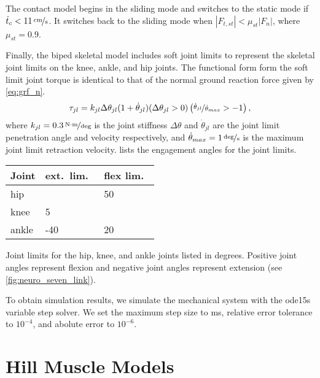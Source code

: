 The contact model begins in the sliding mode and switches to the static mode if
$\dot t_c < 1 \unitfrac[1]{cm}{s}$. It switches back to the sliding mode when
$| F_{t,st} | < \mu_{st} | F_n |$, where $\mu_{st} = 0.9$.

Finally, the biped skeletal model includes soft joint limits to represent
the skeletal joint limits on the knee, ankle, and hip joints. The functional
form form the soft limit joint torque is identical to that of the normal ground
reaction force given by \cref{eq:grf_n}.
\begin{align}
    \tau_{jl} = k_{jl} \Delta \theta_{jl} (1 + \dot \theta_{jl}) (\Delta
    \theta_{jl}  > 0) \left(\nicefrac{\dot \theta_{jl}}{\dot \theta_{max}} > -1
    \right), 
    \label{eq:tau_joint_limit}
\end{align}
where $k_{jl} = \unitfrac[0.3]{N \cdot m}{deg}$ is the joint stiffness $\Delta
\theta$ and $\dot \theta_{jl}$ are the joint limit penetration angle and
velocity respectively, and $\dot \theta_{max} = \unitfrac[1]{deg}{s}$ is the
maximum joint limit retraction velocity.  lists the
engagement angles for the joint limits.
\begin{margintable}
  \centering
      \begin{tabular}{lll}
        \toprule
        Joint & ext.\ lim.\ & flex lim.\ \\
        \midrule
        hip   &     & 50 \\
        knee  &   5 &    \\
        ankle & -40 & 20 \\
        \bottomrule
      \end{tabular}
  \caption{Joint limits for the hip, knee, and ankle joints listed in degrees.
  Positive joint angles represent flexion and negative joint angles represent
  extension (see \cref{fig:neuro_seven_link}).}\label{tab:joint_lim}
\end{margintable}

To obtain simulation results, we simulate the mechanical system with the ode15s
variable step solver. We set the maximum step size to \unit[10]{ms}, relative
error tolerance to $10^{-4}$, and abolute error to $10^{-6}$.

\section{Hill Muscle Models}\label{sec:neuro_hill_muscle}

